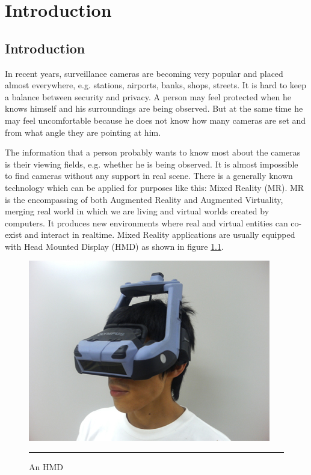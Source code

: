 \chapter{Introduction} %
\label{Chapter1}

\section{Introduction}

In recent years, surveillance cameras are becoming very popular and placed almost everywhere, e.g. stations, airports, banks, shops, streets. It is hard to keep a balance between security and privacy. A person may feel protected when he knows himself and his surroundings are being observed. But at the same time he may feel uncomfortable because he does not know how many cameras are set and from what angle they are pointing at him.

The information that a person probably wants to know most about the cameras is their viewing fields, e.g. whether he is being observed. It is almost impossible to find cameras without any support in real scene. There is a generally known technology which can be applied for purposes like this: Mixed Reality (MR). MR is the encompassing of both Augmented Reality and Augmented Virtuality, merging real world in which we are living and virtual worlds created by computers. It produces new environments where real and virtual entities can co-exist and interact in realtime. Mixed Reality applications are usually equipped with Head Mounted Display (HMD) as shown in figure \ref{fig:HMD}.

\begin{figure}[htbp]
  \centering
    \includegraphics{./Primitives/hmd.jpg}
    \rule{35em}{0.5pt}
  \caption[An HMD]{An HMD}
  \label{fig:HMD}
\end{figure}

